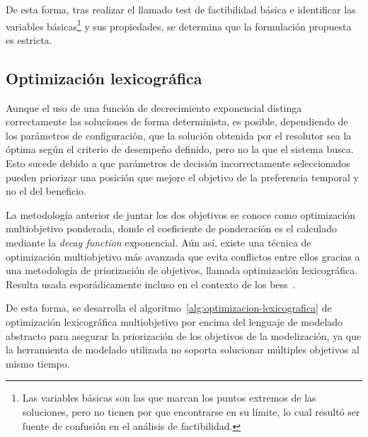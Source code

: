 De esta forma, tras realizar el llamado test de factibilidad básica e identificar las variables básicas\footnote{Las variables básicas son las que marcan los puntos extremos de las soluciones, pero no tienen por que encontrarse en su límite, lo cual resultó ser fuente de confusión en el análisis de factibilidad.} y sus propiedades, se determina que la formulación propuesta es estricta.

\subsection{Optimización lexicográfica}%
\label{makereference5.3.1}

Aunque el uso de una función de decrecimiento exponencial distinga correctamente las soluciones de forma determinista, es posible, dependiendo de los parámetros de configuración, que la solución obtenida por el resolutor sea la óptima según el criterio de desempeño definido, pero no la que el sistema busca. Esto sucede debido a que parámetros de decisión incorrectamente seleccionados pueden priorizar una posición que mejore el objetivo de la preferencia temporal y no el del beneficio.

La metodología anterior de juntar los dos objetivos se conoce como optimización multiobjetivo ponderada, donde el coeficiente de ponderación es el calculado mediante la \textit{decay function} exponencial. Aún así, existe una técnica de optimización multiobjetivo más avanzada que evita conflictos entre ellos gracias a una metodología de priorización de objetivos, llamada optimización lexicográfica. Resulta usada esporádicamente incluso en el contexto de los \gls{bess}~\cite{karimi2019multi}.

De esta forma, se desarrolla el algoritmo~\ref{alg:optimizacion-lexicografica} de optimización lexicográfica multiobjetivo por encima del lenguaje de modelado abstracto para asegurar la priorización de los objetivos de la modelización, ya que la herramienta de modelado utilizada no soporta solucionar múltiples objetivos al mismo tiempo.

